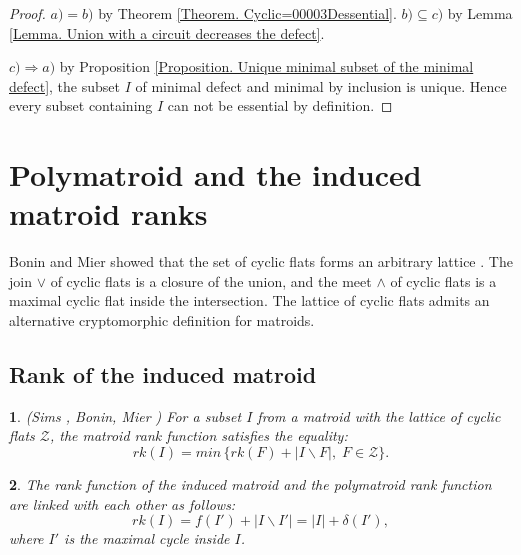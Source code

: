\documentclass[11pt]{article}
\theoremstyle{plain}
\newtheorem{thm}{\protect\theoremname}[section]
\theoremstyle{definition}
\theoremstyle{remark}
\theoremstyle{plain}
\theoremstyle{plain}
\newtheorem{prop}[thm]{\protect\propositionname}
\theoremstyle{plain}
\theoremstyle{definition}
\providecommand{\propositionname}{Proposition}
\providecommand{\theoremname}{Theorem}
\begin{document}
\begin{proof}
$a)=b)$ by Theorem \ref{Theorem. Cyclic=00003Dessential}. $b)\subseteq c)$
by Lemma \ref{Lemma. Union with a circuit decreases the defect}.

$c)\Rightarrow a)$ by Proposition \ref{Proposition. Unique minimal subset of the minimal defect},
the subset $I$ of minimal defect and minimal by inclusion is unique.
Hence every subset containing $I$ can not be essential by definition.
\end{proof}

\section{Polymatroid and the induced matroid ranks}

Bonin and Mier showed that the set of cyclic flats forms an arbitrary
lattice \cite{bonin_lattice_2008}. The join $\vee$ of cyclic flats
is a closure of the union, and the meet $\wedge$ of cyclic flats
is a maximal cyclic flat inside the intersection. The lattice of cyclic
flats admits an alternative cryptomorphic definition for matroids.

\subsection{Rank of the induced matroid}
\begin{thm}
\textup{\label{Theorem. Sims, Bonin, Mier, rank funciton}(Sims \cite{sims_problems_1980},
Bonin, Mier} \textup{\cite{bonin_lattice_2008})} For a subset $I$
from a matroid with the lattice of cyclic flats $\mathcal{Z}$, the
matroid rank function satisfies the equality:
\[
rk(I)=min\,\{rk(F)+|I\backslash F|,\;F\in\mathcal{Z}\}.
\]
\end{thm}

\begin{prop}
\label{Proposition. New formulat for rank}The rank function of the
induced matroid and the polymatroid rank function are linked with
each other as follows:
\[
rk(I)=f(I')+|I\backslash I'|=|I|+\delta(I'),
\]
where $I'$ is the maximal cycle inside $I$.
\end{prop}
\end{document}
